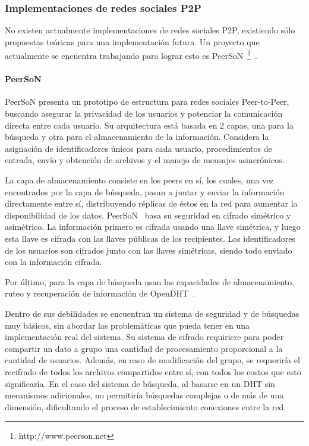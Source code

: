 \subsubsection{Implementaciones de redes sociales P2P}
No existen actualmente implementaciones de redes sociales P2P,
existiendo sólo propuestas teóricas para una implementación futura. Un proyecto
que actualmente se encuentra trabajando para lograr esto es
PeerSoN~\footnote{http://www.peerson.net}~\cite{buchegger:peerson, buchegger:2009:pps:1578002.1578010}.

\paragraph{PeerSoN}
PeerSoN presenta un prototipo de estructura para redes sociales
Peer-to-Peer, buscando asegurar la privacidad de los usuarios y potenciar la
comunicación directa entre cada usuario.
Su arquitectura está basada en 2 capas, una para la búsqueda y otra para el almacenamiento de la
información. Considera la asignación de identificadores únicos para cada
usuario, procedimientos de entrada, envío y obtención de archivos y el manejo
de mensajes asincrónicos.

La capa de almacenamiento consiste en los peers en sí, los cuales, una vez
encontrados por la capa de búsqueda, pasan a juntar y enviar la información
directamente entre sí, distribuyendo réplicas de éstos
en la red para aumentar la disponibilidad de los datos. 
PeerSoN~\cite{buchegger:peerson} basa su seguridad en cifrado simétrico y asimétrico. La
información primero es cifrada usando una llave simétrica, y luego esta
llave es cifrada con las llaves públicas de los recipientes. Los
identificadores de los usuarios son cifrados junto con las llaves
simétricas, siendo todo enviado con la información cifrada.

 Por último, para la capa de búsqueda usan las capacidades de almacenamiento,
ruteo y recuperación de información de
OpenDHT~\cite{Rhea:2005:OPD:1080091.1080102}.

Dentro de sus debilidades se encuentran un sistema de seguridad y de búsquedas
muy básicos, sin abordar las problemáticas que pueda tener en una
implementación real del sistema. Su sistema de cifrado requiriere para poder compartir
un dato a grupo una cantidad de procesamiento proporcional a la
cantidad de usuarios. Además, en caso de modificación del grupo, se requeriría
el recifrado de todos los archivos compartidos entre sí, con todos los
costos que esto significaría. En el caso del sistema de búsqueda, al basarse en
un DHT sin mecanismos adicionales, no permitiría búsquedas complejas o de más
de una dimensión, dificultando el proceso de establecimiento conexiones entre
la red.

